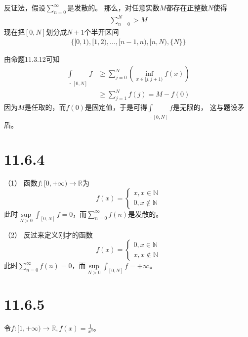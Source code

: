 \documentclass{article}
\begin{document}
\begin{itemize}
        反证法，假设$\sum \limits_{n=0}^\infty$是发散的。
        那么，对任意实数$M$都存在正整数$N$使得
        \begin{align*}
          \sum \limits_{n=0}^{N} > M
        \end{align*}
        现在把$[0, N]$划分成$N+1$个半开区间
        \begin{align*}
          \{[0, 1), [1, 2),...,[n-1, n), [n, N), \{N\}\}
        \end{align*}

        由命题11.3.12可知
        \begin{align*}
          \underline{\int}_{[0, N]} f & \geq \sum\limits_{j=0}^{N} \left( \inf\limits_{x \in [j, j+1)} f(x)  \right) \\
                                      & \geq \sum\limits_{j=1}^{N} f(j) = M - f(0)
        \end{align*}
        因为$M$是任取的，而$f(0)$是固定值，于是可得$\underline{\int}_{[0, N]} f$是无限的，
        这与题设矛盾。
\end{itemize}

\section*{11.6.4}

（1）
函数$f : [0, +\infty) \to \mathbb{R}$为
\begin{equation*}
  f(x) =
  \begin{cases*}
    x, x \in \mathbb{N} \\
    0, x \notin \mathbb{N}
  \end{cases*}
\end{equation*}
此时$\sup\limits_{N > 0}\int_{[0, N]} f = 0$，而$\sum\limits_{n=0}^\infty f(n)$是发散的。

（2）
反过来定义刚才的函数
\begin{equation*}
  f(x) =
  \begin{cases*}
    0, x \in \mathbb{N} \\
    x, x \notin \mathbb{N}
  \end{cases*}
\end{equation*}
此时$\sum\limits_{n=0}^\infty f(n) = 0$，而$\sup\limits_{N > 0}\int_{[0, N]} f = +\infty$。

\section*{11.6.5}

令$f: [1, +\infty) \to \mathbb{R}, f(x) = \frac{1}{x^q}$。
\end{document}
